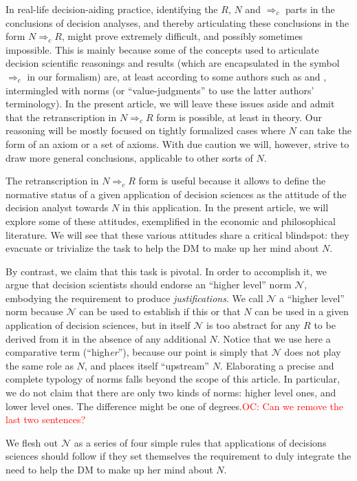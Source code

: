 \documentclass[preprint, french, english, 11pt, authoryear]{elsarticle}%
\newcommand{\commentOC}[1]{\textcolor{red}{OC: #1}}
\newcommand{\adv}{\mathscr{N}}
\begin{document}
In real-life decision-aiding practice, identifying the $R$, $N$ and $⇒_c$ parts in the conclusions of decision analyses, and thereby articulating these conclusions in the form $N ⇒_c R$, might prove extremely difficult, and possibly sometimes impossible. This is mainly because some of the concepts used to articulate decision scientific reasonings and results (which are encapsulated in the symbol $⇒_c$ in our formalism) are, at least according to some authors such as \citet{mongin_value_2006} and \citet{baujard_value_2013}, intermingled with norms (or “value-judgments” to use the latter authors' terminology). In the present article, we will leave these issues aside and admit that the retranscription in $N ⇒_c R$ form is possible, at least  in theory. Our reasoning will be mostly focused on tightly formalized cases where $N$ can take the form of an axiom or a set of axioms. With due caution we will, however, strive to draw more general conclusions, applicable to other sorts of $N$.

The retranscription in $N ⇒_c R$ form is useful because it allows to define the normative status of a given application of decision sciences as the attitude of the decision analyst towards $N$ in this application. In the present article, we will explore some of these attitudes, exemplified in the economic and philosophical literature. We will see that these various attitudes share a critical blindspot: they evacuate or trivialize the task to help the \ac{DM} to make up her mind about $N$.

By contrast, we claim that this task is pivotal. In order to accomplish it, we argue that decision scientists should endorse an “higher level” norm $\adv$, embodying the requirement to produce \emph{justifications}. We call $\adv$ a “higher level” norm because $\adv$ can be used to establish if this or that $N$ can be used in a given application of decision sciences, but in itself $\adv$ is too abstract for any $R$ to be derived from it in the absence of any additional $N$. Notice that we use here a comparative term (“high\emph{er}”), because our point is simply that $\adv$ does not play the same role as $N$, and places itself “upstream” $N$. Elaborating a precise and complete typology of norms falls beyond the scope of this article. In particular, we do not claim that there are only two kinds of norms: higher level ones, and lower level ones. The difference might be one of degrees.\commentOC{Can we remove the last two sentences?}

We flesh out $\adv$ as a series of four simple rules that applications of decisions sciences should follow if they set themselves the requirement to duly integrate the need to help the \ac{DM} to make up her mind about $N$. 
\end{document}
